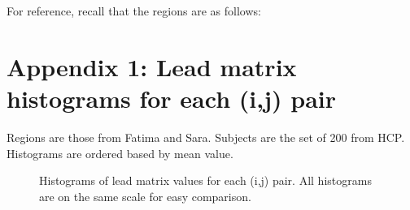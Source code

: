 \documentclass[11pt]{article}
\begin{document}
For reference, recall that the regions are as follows:



\section{Appendix 1: Lead matrix histograms for each (i,j) pair}
Regions are those from Fatima and Sara. Subjects are the set of 200 from HCP. Histograms are ordered based by mean value.
\label{app:slm_hist}
\begin{figure}[H]

\caption{Histograms of lead matrix values for each (i,j) pair. All histograms are on the same scale for easy comparison.}
\end{figure}
\end{document}
